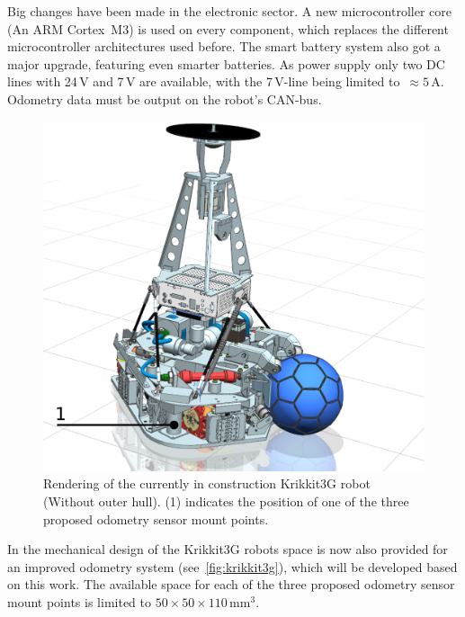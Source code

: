 \documentclass[12pt,a4paper]{article}
\begin{document}
Big changes have been made in the electronic sector.
A new microcontroller core (An ARM Cortex~M3) is used on every component, which replaces the different microcontroller architectures used before.
The smart battery system also got a major upgrade, featuring even smarter batteries.
As power supply only two DC lines with 24\,V and 7\,V are available, with the 7\,V-line being limited to~$\approx5$\,A.
Odometry data must be output on the robot's CAN-bus.

\begin{figure}[htbp]
\begin{center}  
\includegraphics[width=0.7\columnwidth]{figures/Krikkit3G.pdf}
\caption{\label{fig:krikkit3g}
Rendering of the currently in construction Krikkit3G robot (Without outer hull).
(1) indicates the position of one of the three proposed odometry sensor mount points.
}   
\end{center}
\end{figure}

In the mechanical design of the Krikkit3G robots space is now also provided for an improved odometry system (see~\autoref{fig:krikkit3g}), which will be developed based on this work.
The available space for each of the three proposed odometry sensor mount points is limited to $50\times50\times110$\,mm$^3$.
\end{document}
